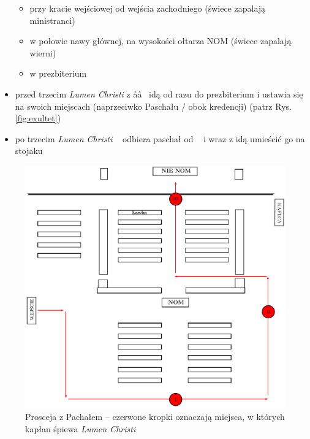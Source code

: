 \begin{itemize}
	      \begin{itemize}
		      \item przy kracie wejściowej od wejścia zachodniego (świece
		            zapalają ministranci)
		      \item w połowie nawy głównej, na wysokości ołtarza NOM (świece
		            zapalają wierni)
		      \item w prezbiterium
	      \end{itemize}
	\item przed trzecim \textit{Lumen Christi}  z \aa\aa~ idą od razu do
	      prezbiterium i ustawia się na swoich miejscach (naprzeciwko
	      Paschału / obok kredencji) (patrz Rys.\ref{fig:exultet})
	\item po trzecim \textit{Lumen Christi} \paschal~ odbiera paschał od \ii~ i wraz
	      z  idą umieścić go na stojaku
\end{itemize}

\begin{figure}[h]
	\centering
	\includegraphics[width=0.6\linewidth]{Figures/Sobota/procesja.pdf}
	\caption{Prosceja z Pachałem -- czerwone kropki oznaczają miejsca,
		w których kapłan śpiewa \textit{Lumen Christi}}
	\label{fig:procesja_sb}
\end{figure}

